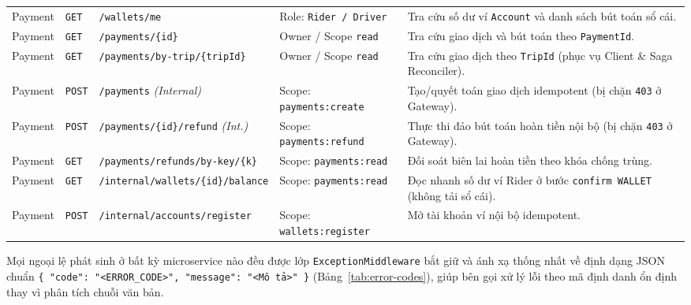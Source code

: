 \documentclass[12pt,a4paper]{article}
\newcommand{\ab}{\allowbreak}
\begin{document}
{\begin{longtable}{L{1.8cm} L{1.1cm} L{4.2cm} L{2.5cm} L{4.7cm}}
Payment & \texttt{GET} & \texttt{/wallets/me} & Role: \texttt{Rider / Driver} & Tra cứu số dư ví \texttt{Account} và danh sách bút toán sổ cái. \\
Payment & \texttt{GET} & \texttt{/payments/\{id\}} & Owner / Scope \texttt{read} & Tra cứu giao dịch và bút toán theo \texttt{PaymentId}. \\
Payment & \texttt{GET} & \texttt{/payments/\ab by-trip/\{tripId\}} & Owner / Scope \texttt{read} & Tra cứu giao dịch theo \texttt{TripId} (phục vụ Client \& Saga Reconciler). \\
Payment & \texttt{POST} & \texttt{/payments} \textit{(Internal)} & Scope: \texttt{payments:\ab create} & Tạo/quyết toán giao dịch idempotent (bị chặn \texttt{403} ở Gateway). \\
Payment & \texttt{POST} & \texttt{/payments/\{id\}/refund} \textit{(Int.)} & Scope: \texttt{payments:\ab refund} & Thực thi đảo bút toán hoàn tiền nội bộ (bị chặn \texttt{403} ở Gateway). \\
Payment & \texttt{GET} & \texttt{/payments/\ab refunds/\ab by-key/\{k\}} & Scope: \texttt{payments:\ab read} & Đối soát biên lai hoàn tiền theo khóa chống trùng. \\
Payment & \texttt{GET} & \texttt{/internal/\ab wallets/\ab \{id\}/balance} & Scope: \texttt{payments:\ab read} & Đọc nhanh số dư ví Rider ở bước \texttt{confirm WALLET} (không tải sổ cái). \\
Payment & \texttt{POST} & \texttt{/internal/\ab accounts/\ab register} & Scope: \texttt{wallets:\ab register} & Mở tài khoản ví nội bộ idempotent. \\
\end{longtable}
\renewcommand{\arraystretch}{1.0}
}

Mọi ngoại lệ phát sinh ở bất kỳ microservice nào đều được lớp \texttt{ExceptionMiddleware} bắt giữ và ánh xạ thống nhất về định dạng JSON chuẩn \texttt{\{ "code": "<ERROR\_CODE>", "message": "<Mô tả>" \}} (Bảng~\ref{tab:error-codes}), giúp bên gọi xử lý lỗi theo mã định danh ổn định thay vì phân tích chuỗi văn bản.
\end{document}
